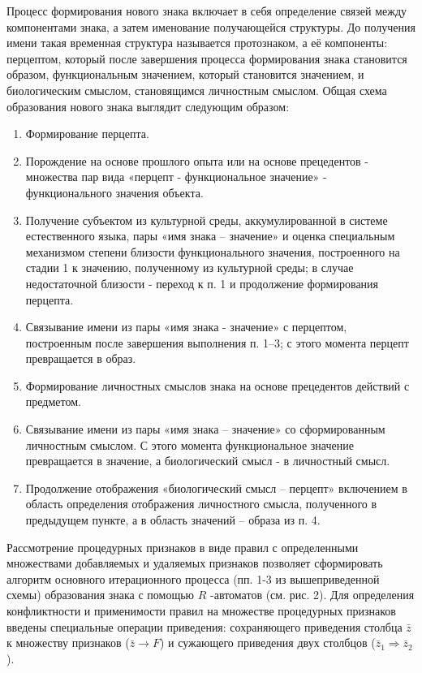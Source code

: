 \documentclass{svjour3}                     %
\begin{document}
Процесс формирования нового знака включает в себя определение связей между компонентами знака, а затем именование получающейся структуры. До получения имени такая временная структура называется протознаком, а её компоненты: перцептом, который после завершения процесса формирования знака становится образом, функциональным значением, который становится значением, и биологическим смыслом, становящимся личностным смыслом. Общая схема образования нового знака выглядит следующим образом:
\begin{enumerate}
	\item Формирование перцепта.
	\item Порождение на основе прошлого опыта или на основе прецедентов - множества пар вида «перцепт - функциональное значение» - функционального значения объекта.
	\item Получение субъектом из культурной среды, аккумулированной в системе естественного языка, пары «имя знака – значение» и оценка специальным механизмом степени близости функционального значения, построенного на стадии 1 к значению, полученному из культурной среды; в случае недостаточной близости - переход к п. 1 и продолжение формирования перцепта.
	\item Связывание имени из пары «имя знака - значение» с перцептом, построенным после завершения выполнения п. 1–3; с этого момента перцепт превращается в образ.
	\item Формирование личностных смыслов знака на основе прецедентов действий с предметом.
	\item Связывание имени из пары «имя знака – значение» со сформированным личностным смыслом. С этого момента функциональное значение превращается в значение, а биологический смысл - в личностный смысл.
	\item Продолжение отображения «биологический смысл – перцепт» включением в область определения отображения личностного смысла, полученного в предыдущем пункте, а в область значений – образа из п. 4.
\end{enumerate}

Рассмотрение процедурных признаков в виде правил с определенными множествами добавляемых и удаляемых признаков позволяет сформировать алгоритм основного итерационного процесса (пп. 1-3 из вышеприведенной схемы) образования знака с помощью $R$ -автоматов (см. рис. 2). Для определения конфликтности и применимости правил на множестве процедурных признаков введены специальные операции приведения: сохраняющего приведения  столбца $\bar{z}$ к множеству признаков ($\bar{z}\to F$) и сужающего приведения двух столбцов (${{\bar{z}}_{1}}\Rightarrow {{\bar{z}}_{2}}$).
\end{document}
